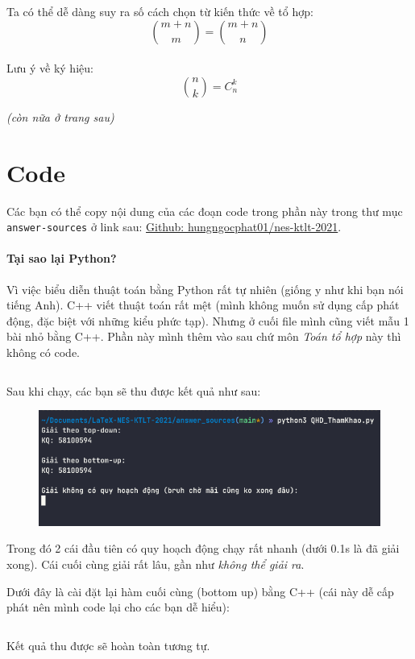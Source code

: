 \documentclass[12pt]{article}
\begin{document}
Ta có thể dễ dàng suy ra số cách chọn từ kiến thức về tổ hợp:
$$
{m+n \choose m} = {m + n \choose n}
$$
\\[0.5cm]


Lưu ý về ký hiệu: 
$$
{n \choose k} = C_{n}^{k}
$$\bigskip 

\textit{(còn nữa ở trang sau)}
\pagebreak

\section{Code} \label{code}
Các bạn có thể copy nội dung của các đoạn code trong phần này trong thư mục \verb#answer-sources# ở link sau: \href{https://github.com/hungngocphat01/nes-ktlt-2021}{Github: hungngocphat01/nes-ktlt-2021}. \bigskip 

\paragraph{Tại sao lại Python?} Vì việc biểu diễn thuật toán bằng Python rất tự nhiên (giống y như khi bạn nói tiếng Anh). C++ viết thuật toán rất mệt (mình không muốn sử dụng cấp phát động, đặc biệt với những kiểu phức tạp). Nhưng ở cuối file mình cũng viết mẫu 1 bài nhỏ bằng C++. Phần này mình thêm vào sau chứ môn \textit{Toán tổ hợp} này thì không có code. \bigskip 

\inputminted[linenos,breaklines]{python}{answer_sources/QHD_ThamKhao.py}

Sau khi chạy, các bạn sẽ thu được kết quả như sau:
\begin{figure}[H]
    \centering 
    \includegraphics[width=\textwidth]{image/qhd_run.png}
\end{figure}
Trong đó 2 cái đầu tiên có quy hoạch động chạy rất nhanh (dưới 0.1s là đã giải xong). Cái cuối cùng giải rất lâu, gần như \textit{không thể giải ra}. \bigskip 

Dưới đây là cài đặt lại hàm cuối cùng (bottom up) bằng C++ (cái này dễ cấp phát nên mình code lại cho các bạn dễ hiểu):
\inputminted[linenos,breaklines]{cpp}{answer_sources/QHD_ThamKhao2.cpp}
Kết quả thu được sẽ hoàn toàn tương tự.
\end{document}
